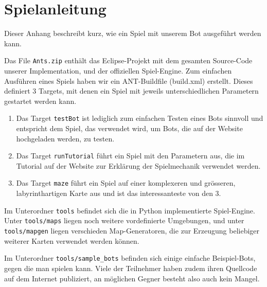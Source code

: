 \chapter{Spielanleitung}
\label{chap:spielanleitung}

Dieser Anhang beschreibt kurz, wie ein Spiel mit unserem Bot ausgef\"uhrt werden kann.
  
Das File \texttt{Ants.zip} enth\"alt das Eclipse-Projekt mit dem gesamten Source-Code unserer Implementation, und der offiziellen Spiel-Engine. Zum einfachen Ausf\"uhren eines Spiels haben wir ein ANT-Buildfile (build.xml) erstellt. Dieses definiert 3 Targets, mit denen ein Spiel mit jeweils unterschiedlichen Parametern gestartet werden kann.
\begin{enumerate}
\item{Das Target \texttt{testBot} ist lediglich zum einfachen Testen eines Bots sinnvoll und entspricht dem Spiel, das verwendet wird, um Bots, die auf der Website hochgeladen werden, zu testen.}

\item{Das Target \texttt{runTutorial} f\"uhrt ein Spiel mit den Parametern aus, die im Tutorial auf der Website zur Erkl\"arung der Spielmechanik verwendet werden.}
\item{
Das Target \texttt{maze} f\"uhrt ein Spiel auf einer komplexeren und gr\"osseren, labyrinthartigen Karte aus und ist das interessanteste von den 3.}

\end{enumerate}

Im Unterordner \texttt{tools} befindet sich die in Python implementierte Spiel-Engine. Unter \texttt{tools/maps} liegen noch weitere vordefinierte Umgebungen, und unter \texttt{tools/mapgen} liegen verschieden Map-Generatoren, die zur Erzeugung beliebiger weiterer Karten verwendet werden k\"onnen. 

Im Unterordner \texttt{tools/sample\_bots} befinden sich einige einfache Beispiel-Bots, gegen die man spielen kann. Viele der Teilnehmer haben zudem ihren Quellcode auf dem Internet publiziert, an m\"oglichen Gegner besteht also auch kein Mangel.